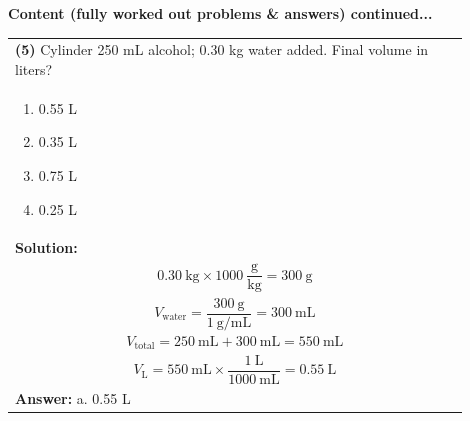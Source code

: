 \documentclass{article}
\begin{document}
{\newpage
\noindent
{\large\textbf{Content (fully worked out problems \& answers) continued...}}\\[0.2em]
\vspace{0.2cm}
\begin{tabular}{|p{0.9\linewidth}|}
\hline
\vspace{0.2cm}
\textbf{(5)} Cylinder 250 mL alcohol; 0.30 kg water added. Final volume in liters? \\
\begin{minipage}[t]{0.85\linewidth}
\begin{enumerate}[label=\alph*.]
   \item 0.55 L
   \item 0.35 L
   \item 0.75 L
   \item 0.25 L
\end{enumerate}
\end{minipage}\\
\hline
\vspace{0.2cm}
\textbf{Solution:} \\
\[
0.30~\text{kg} \times 1000~\frac{\text{g}}{\text{kg}} = 300~\text{g}
\] \\
\[
V_\text{water} = \frac{300~\text{g}}{1~\text{g/mL}} = 300~\text{mL}
\] \\
\[
V_\text{total} = 250~\text{mL} + 300~\text{mL} = 550~\text{mL}
\] \\
\[
V_\text{L} = 550~\text{mL} \times \frac{1~\text{L}}{1000~\text{mL}} = 0.55~\text{L}
\] \\ 
\hline
\vspace{0.2cm}
\textbf{Answer:} a. 0.55 L \\
\hline
\end{tabular}

}
\end{document}
